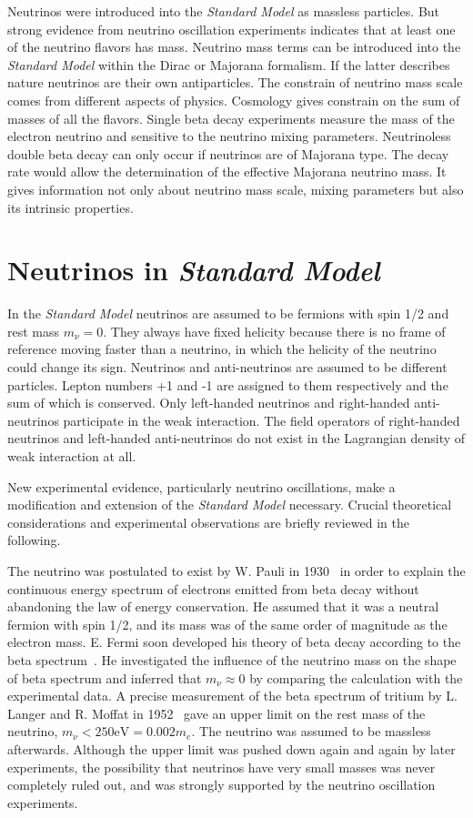 Neutrinos were introduced into the \emph{Standard Model} as massless particles. But strong evidence from neutrino oscillation experiments indicates that at least one of the neutrino flavors has mass. Neutrino mass terms can be introduced into the \emph{Standard Model} within the Dirac or Majorana formalism. If the latter describes nature neutrinos are their own antiparticles. The constrain of neutrino mass scale comes from different aspects of physics. Cosmology gives constrain on the sum of masses of all the flavors. Single beta decay experiments measure the mass of the electron neutrino and sensitive to the neutrino mixing parameters. Neutrinoless double beta decay can only occur if neutrinos are of Majorana type. The decay rate would allow the determination of the effective Majorana neutrino mass. It gives information not only about neutrino mass scale, mixing parameters but also its intrinsic properties.

\section{Neutrinos in \emph{Standard Model}}
\label{sec:sm}
In the \emph{Standard Model} neutrinos are assumed to be fermions with spin 1/2 and rest mass $m_\nu=0$. They always have fixed helicity because there is no frame of reference moving faster than a neutrino, in which the helicity of the neutrino could change its sign. Neutrinos and anti-neutrinos are assumed to be different particles. Lepton numbers +1 and -1 are assigned to them respectively and the sum of which is conserved. Only left-handed neutrinos and right-handed anti-neutrinos participate in the weak interaction. The field operators of right-handed neutrinos and left-handed anti-neutrinos do not exist in the Lagrangian density of weak interaction at all.

New experimental evidence, particularly neutrino oscillations, make a modification and extension of the \emph{Standard Model} necessary. Crucial theoretical considerations and experimental observations are briefly reviewed in the following.

The neutrino was postulated to exist by W. Pauli in 1930~\cite{Pau30} in order to explain the continuous energy spectrum of electrons emitted from beta decay without abandoning the law of energy conservation. He assumed that it was a neutral fermion with spin 1/2, and its mass was of the same order of magnitude as the electron mass. E.  Fermi soon developed his theory of beta decay according to the beta spectrum~\cite{Fer33,Fer34}. He investigated the influence of the neutrino mass on the shape of beta spectrum and inferred that $m_\nu \approx 0$ by comparing the calculation with the experimental data. A precise measurement of the beta spectrum of tritium by L. Langer and R. Moffat in 1952~\cite{Lan52} gave an upper limit on the rest mass of the neutrino, $m_\nu < 250 \mbox{eV} = 0.002m_e$. The neutrino was assumed to be massless afterwards. Although the upper limit was pushed down again and again by later experiments, the possibility that neutrinos have very small masses was never completely ruled out, and was strongly supported by the neutrino oscillation experiments.

